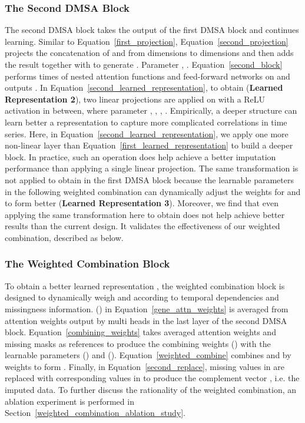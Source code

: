 \documentclass{article}
\begin{document}
\subsubsection{The Second DMSA Block} \label{SAITS: the 2nd block}
 

 
The second DMSA block takes the output  of the first DMSA block and continues learning. Similar to Equation~\ref{first_projection}, Equation~\ref{second_projection} projects the concatenation of  and  from  dimensions to  dimensions and then adds the result together with  to generate . Parameter , . Equation~\ref{second_block} performs  times of nested attention functions and feed-forward networks on  and outputs . In Equation~\ref{second_learned_representation}, to obtain  (\textbf{Learned Representation 2}), two linear projections are applied on  with a ReLU activation in between, where parameter , , , . Empirically, a deeper structure can learn better a representation to capture more complicated correlations in time series. Here, in Equation~\ref{second_learned_representation}, we apply one more non-linear layer than Equation~\ref{first_learned_representation} to build a deeper block. In practice, such an operation does help achieve a better imputation performance than applying a single linear projection. The same transformation is not applied to obtain  in the first DMSA block because the learnable parameters in the following weighted combination can dynamically adjust the weights for  and  to form better  (\textbf{Learned Representation 3}). Moreover, we find that even applying the same transformation here to obtain  does not help achieve better results than the current design. It validates the effectiveness of our weighted combination, described as below.

\subsubsection{The Weighted Combination Block} \label{SAITS: the weighted combination block}



 
To obtain a better learned representation , the weighted combination block is designed to dynamically weigh  and  according to temporal dependencies and missingness information.  () in Equation~\ref{gene_attn_weights} is averaged from attention weights  output by multi heads in the last layer of the second DMSA block. Equation~\ref{combining_weights} takes averaged attention weights  and missing masks  as references to produce the combining weights  () with the learnable parameters  () and  (). Equation~\ref{weighted_combine} combines  and  by weights  to form . Finally, in Equation~\ref{second_replace}, missing values in  are replaced with corresponding values in  to produce the complement vector , i.e. the imputed data. To further discuss the rationality of the weighted combination, an ablation experiment is performed in Section~\ref{weighted_combination_ablation_study}.
\end{document}

